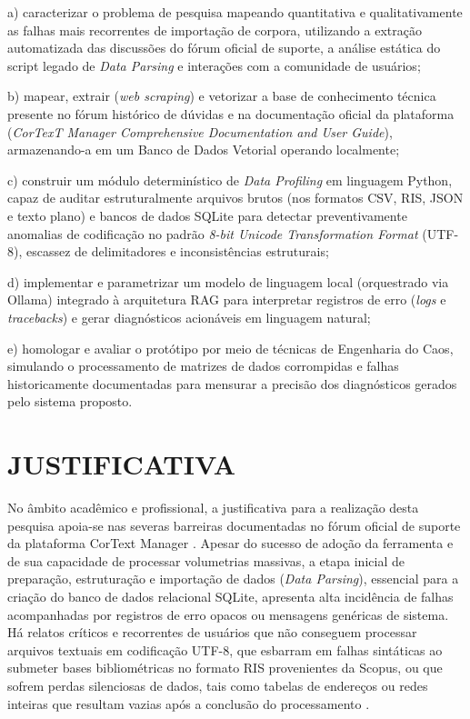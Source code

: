 \documentclass[
	oneside,
	a4paper,
	12pt,
	chapter=TITLE,
	section=TITLE,
	english,
	brazilian
]{abntex2}
\begin{document}
\par\indent a) caracterizar o problema de pesquisa mapeando quantitativa e qualitativamente as falhas mais recorrentes de importação de corpora, utilizando a extração automatizada das discussões do fórum oficial de suporte, a análise estática do script legado de \textit{Data Parsing} e interações com a comunidade de usuários;
\par\indent b) mapear, extrair (\textit{web scraping}) e vetorizar a base de conhecimento técnica presente no fórum histórico de dúvidas e na documentação oficial da plataforma (\textit{CorTexT Manager Comprehensive Documentation and User Guide}), armazenando-a em um Banco de Dados Vetorial operando localmente;
\par\indent c) construir um módulo determinístico de \textit{Data Profiling} em linguagem Python, capaz de auditar estruturalmente arquivos brutos (nos formatos CSV, RIS, JSON e texto plano) e bancos de dados SQLite para detectar preventivamente anomalias de codificação no padrão \textit{8-bit Unicode Transformation Format} (UTF-8), escassez de delimitadores e inconsistências estruturais;
\par\indent d) implementar e parametrizar um modelo de linguagem local (orquestrado via Ollama) integrado à arquitetura RAG para interpretar registros de erro (\textit{logs} e \textit{tracebacks}) e gerar diagnósticos acionáveis em linguagem natural;
\par\indent e) homologar e avaliar o protótipo por meio de técnicas de Engenharia do Caos, simulando o processamento de matrizes de dados corrompidas e falhas historicamente documentadas para mensurar a precisão dos diagnósticos gerados pelo sistema proposto.

\FloatBarrier
\section{JUSTIFICATIVA}\label{sec:justificativa}


No âmbito acadêmico e profissional, a justificativa para a realização desta pesquisa apoia-se nas severas barreiras documentadas no fórum oficial de suporte da plataforma CorText Manager \cite{CorText2026}. Apesar do sucesso de adoção da ferramenta e de sua capacidade de processar volumetrias massivas, a etapa inicial de preparação, estruturação e importação de dados (\textit{Data Parsing}), essencial para a criação do banco de dados relacional SQLite, apresenta alta incidência de falhas acompanhadas por registros de erro opacos ou mensagens genéricas de sistema. Há relatos críticos e recorrentes de usuários que não conseguem processar arquivos textuais em codificação UTF-8, que esbarram em falhas sintáticas ao submeter bases bibliométricas no formato RIS provenientes da Scopus, ou que sofrem perdas silenciosas de dados, tais como tabelas de endereços ou redes inteiras que resultam vazias após a conclusão do processamento \cite{CorText2026}.
\end{document}
